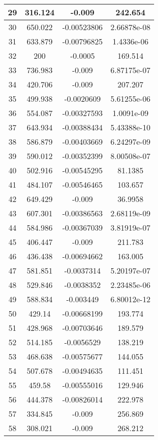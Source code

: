 \begin{table}[h]
{\begin{tabular}{|c|c|c|c|}
29	&	316.124	&	-0.009	&	242.654	\\	\hline
30	&	650.022	&	-0.00523806	&	2.66878e-08	\\	\hline
31	&	633.879	&	-0.00796825	&	1.4336e-06	\\	\hline
32	&	200	&	-0.0005	&	169.514	\\	\hline
33	&	736.983	&	-0.009	&	6.87175e-07	\\	\hline
34	&	420.706	&	-0.009	&	207.207	\\	\hline
35	&	499.938	&	-0.0020609	&	5.61255e-06	\\	\hline
36	&	554.087	&	-0.00327593	&	1.0091e-09	\\	\hline
37	&	643.934	&	-0.00388434	&	5.43388e-10	\\	\hline
38	&	586.879	&	-0.00403669	&	6.24297e-09	\\	\hline
39	&	590.012	&	-0.00352399	&	8.00508e-07	\\	\hline
40	&	502.916	&	-0.00545295	&	81.1385	\\	\hline
41	&	484.107	&	-0.00546465	&	103.657	\\	\hline
42	&	649.429	&	-0.009	&	36.9958	\\	\hline
43	&	607.301	&	-0.00386563	&	2.68119e-09	\\	\hline
44	&	584.986	&	-0.00367039	&	3.81919e-07	\\	\hline
45	&	406.447	&	-0.009	&	211.783	\\	\hline
46	&	436.438	&	-0.00694662	&	163.005	\\	\hline
47	&	581.851	&	-0.0037314	&	5.20197e-07	\\	\hline
48	&	529.846	&	-0.0038352	&	2.23485e-06	\\	\hline
49	&	588.834	&	-0.003449	&	6.80012e-12	\\	\hline
50	&	429.14	&	-0.00668199	&	193.774	\\	\hline
51	&	428.968	&	-0.00703646	&	189.579	\\	\hline
52	&	514.185	&	-0.0056529	&	138.219	\\	\hline
53	&	468.638	&	-0.00575677	&	144.055	\\	\hline
54	&	507.678	&	-0.00494635	&	111.451	\\	\hline
55	&	459.58	&	-0.00555016	&	129.946	\\	\hline
56	&	444.378	&	-0.00826014	&	222.978	\\	\hline
57	&	334.845	&	-0.009	&	256.869	\\	\hline
58	&	308.021	&	-0.009	&	268.212	\\	\hline

\end{tabular}}
\end{table}
